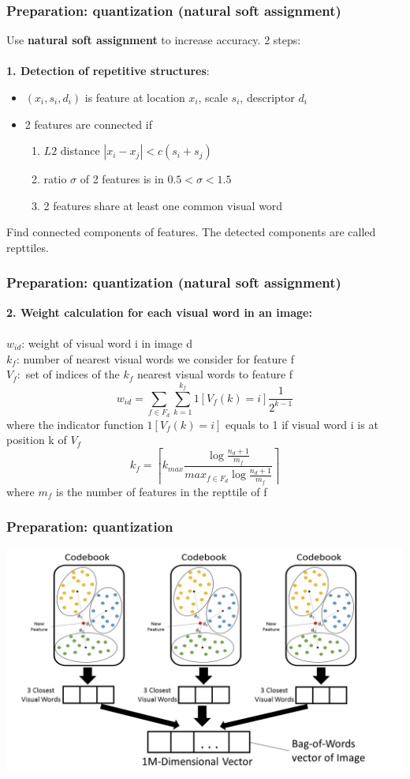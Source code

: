 \begin{frame}
	\frametitle{Preparation: quantization (natural soft assignment)}
	Use \textbf{natural soft assignment} to increase accuracy. 2 steps:\\\\
	\textbf{1. Detection of repetitive structures}:
	\begin{itemize}
		\item ${(x_{i},s_{i},d_{i})}$ is feature at location $x_{i}$, scale $s_{i}$, descriptor $d_{i}$
		\item 2 features are connected if
		\begin{enumerate}
			\item $L2$ distance $|x_{i}-x_{j}| < c(s_{i}+s_{j})$
			\item ratio $\sigma$ of 2 features is in $0.5 < \sigma < 1.5$
			\item 2 features share at least one common visual word
		\end{enumerate}
	\end{itemize}
	Find connected components of features. The detected components are called repttiles.
	
\end{frame}
	
\begin{frame}
	\frametitle{Preparation: quantization (natural soft assignment)}
	\textbf{2. Weight calculation for each visual word in an image:}\\\\
	$w_{id}$: weight of visual word i in image d\\
	$k_{f}$: number of nearest visual words we consider for feature f\\
	$V_{f}:$ set of indices of the $k_{f}$ nearest visual words to feature f
	\begin{equation*}
		w_{id}=\sum\limits_{f \in F_{d}} \sum\limits_{k=1}^{k_{f}}1[V_{f}(k)=i]\frac{1}{2^{k-1}}
	\end{equation*}
	where the indicator function $1[V_{f}(k)=i]$ equals to 1 if visual word i is at position k of $V_{f}$
	\begin{equation*}
		k_{f}=\left \lceil{k_{max} \frac{\log{\frac{n_{d}+1}{m_{f}}}}{max_{f \in F_{d}}\log{\frac{n_{d}+1}{m_{f}}}} }\right \rceil 
	\end{equation*}
	where $m_{f}$ is the number of features in the repttile of f
\end{frame}

\begin{frame}
	\frametitle{Preparation: quantization}
	\begin{center}
	\includegraphics[width=\textwidth]{images/quantization.png}
	\end{center}
\end{frame}
